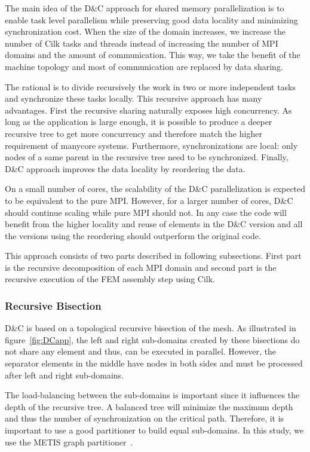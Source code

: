 \documentclass{IOS-Book-Article}
\begin{document}
The main idea of the D\&C approach for shared memory parallelization is to enable task level parallelism while preserving good data locality and minimizing synchronization cost.
When the size of the domain increases, we increase the number of Cilk tasks and threads instead of increasing the number of MPI domains and the amount of communication.
This way, we take the benefit of the machine topology and most of communication are replaced by data sharing.

The rational is to divide recursively the work in two or more independent tasks and synchronize these tasks locally. This recursive approach has many advantages.
First the recursive sharing naturally exposes high concurrency. As long as the application is large enough, it is possible to produce a deeper recursive tree to get more concurrency and 
therefore match the higher requirement of manycore systems. Furthermore, synchronizations are local: only nodes of a same parent in the recursive tree need to be synchronized.
Finally, D\&C approach improves the data locality by reordering the data. 

On a small number of cores, the scalability of the D\&C parallelization is expected to be equivalent to the pure MPI.
However, for a larger number of cores, D\&C should continue scaling while pure MPI should not.
In any case the code will benefit from the higher locality and reuse of elements in the D\&C version and all the versions using the reordering should outperform the original code.

This approach consists of two parts described in following subsections.
First part is the recursive decomposition of each MPI domain and second part is the recursive execution of the FEM assembly step using Cilk.

\subsubsection{Recursive Bisection}
\label{sec:DCrec}
D\&C is based on a topological recursive bisection of the mesh.
As illustrated in figure~\ref{fig:DCapp}, the left and right sub-domains created by these bisections do not share any element and thus, can be executed in parallel.
However, the separator elements in the middle have nodes in both sides and must be processed after left and right sub-domains.

The load-balancing between the sub-domains is important since it influences the depth of the recursive tree.
A balanced tree will minimize the maximum depth and thus the number of synchronization on the critical path.
Therefore, it is important to use a good partitioner to build equal sub-domains. In this study, we use the METIS graph partitioner~\cite{Metis}.
\end{document}
